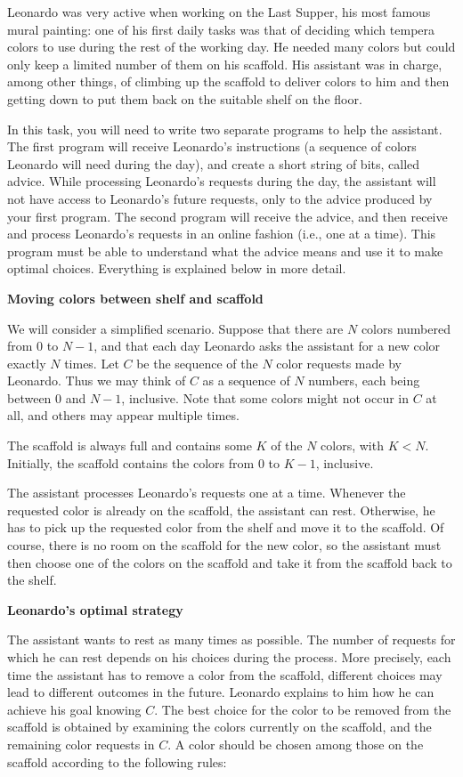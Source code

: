 Leonardo was very active when working on the Last Supper, his most famous mural painting: one of his first daily tasks was that of deciding which tempera colors to use during the rest of the working day. He needed many colors but could only keep a limited number of them on his scaffold. His assistant was in charge, among other things, of climbing up the scaffold to deliver colors to him and then getting down to put them back on the suitable shelf on the floor.

In this task, you will need to write two separate programs to help the assistant. The first program will receive Leonardo's instructions (a sequence of colors Leonardo will need during the day), and create a short string of bits, called advice. While processing Leonardo's requests during the day, the assistant will not have access to Leonardo's future requests, only to the advice produced by your first program. The second program will receive the advice, and then receive and process Leonardo's requests in an online fashion (i.e., one at a time). This program must be able to understand what the advice means and use it to make optimal choices. Everything is explained below in more detail.

\bf{Moving colors between shelf and scaffold}

We will consider a simplified scenario. Suppose that there are $N$ colors numbered from $0$ to $N-1$, and that each day Leonardo asks the assistant for a new color exactly $N$ times. Let $C$ be the sequence of the $N$ color requests made by Leonardo. Thus we may think of $C$ as a sequence of $N$ numbers, each being between $0$ and $N-1$, inclusive. Note that some colors might not occur in $C$ at all, and others may appear multiple times.

The scaffold is always full and contains some $K$ of the $N$ colors, with $K < N$. Initially, the scaffold contains the colors from $0$ to $K-1$, inclusive.

The assistant processes Leonardo's requests one at a time. Whenever the requested color is already on the scaffold, the assistant can rest. Otherwise, he has to pick up the requested color from the shelf and move it to the scaffold. Of course, there is no room on the scaffold for the new color, so the assistant must then choose one of the colors on the scaffold and take it from the scaffold back to the shelf.

\bf{Leonardo's optimal strategy}

The assistant wants to rest as many times as possible. The number of requests for which he can rest depends on his choices during the process. More precisely, each time the assistant has to remove a color from the scaffold, different choices may lead to different outcomes in the future. Leonardo explains to him how he can achieve his goal knowing $C$. The best choice for the color to be removed from the scaffold is obtained by examining the colors currently on the scaffold, and the remaining color requests in $C$. A color should be chosen among those on the scaffold according to the following rules:

